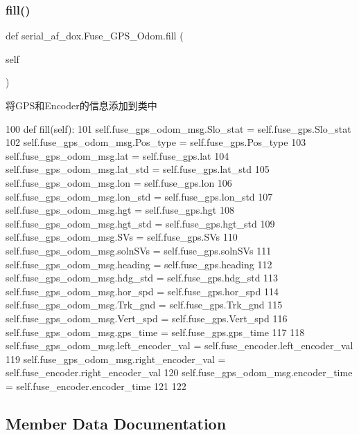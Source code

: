 \subsubsection{\texorpdfstring{fill()}{fill()}}
{\footnotesize\ttfamily def serial\+\_\+af\+\_\+dox.\+Fuse\+\_\+\+G\+P\+S\+\_\+\+Odom.\+fill (\begin{DoxyParamCaption}\item[{}]{self }\end{DoxyParamCaption})}



将\+G\+P\+S和\+Encoder的信息添加到类中 


\begin{DoxyCode}
100     \textcolor{keyword}{def }fill(self):
101         self.fuse\_gps\_odom\_msg.Slo\_stat = self.fuse\_gps.Slo\_stat
102         self.fuse\_gps\_odom\_msg.Pos\_type = self.fuse\_gps.Pos\_type
103         self.fuse\_gps\_odom\_msg.lat = self.fuse\_gps.lat
104         self.fuse\_gps\_odom\_msg.lat\_std = self.fuse\_gps.lat\_std
105         self.fuse\_gps\_odom\_msg.lon = self.fuse\_gps.lon
106         self.fuse\_gps\_odom\_msg.lon\_std = self.fuse\_gps.lon\_std
107         self.fuse\_gps\_odom\_msg.hgt = self.fuse\_gps.hgt
108         self.fuse\_gps\_odom\_msg.hgt\_std = self.fuse\_gps.hgt\_std
109         self.fuse\_gps\_odom\_msg.SVs = self.fuse\_gps.SVs
110         self.fuse\_gps\_odom\_msg.solnSVs = self.fuse\_gps.solnSVs
111         self.fuse\_gps\_odom\_msg.heading = self.fuse\_gps.heading
112         self.fuse\_gps\_odom\_msg.hdg\_std = self.fuse\_gps.hdg\_std
113         self.fuse\_gps\_odom\_msg.hor\_spd = self.fuse\_gps.hor\_spd
114         self.fuse\_gps\_odom\_msg.Trk\_gnd = self.fuse\_gps.Trk\_gnd
115         self.fuse\_gps\_odom\_msg.Vert\_spd = self.fuse\_gps.Vert\_spd
116         self.fuse\_gps\_odom\_msg.gps\_time = self.fuse\_gps.gps\_time
117 
118         self.fuse\_gps\_odom\_msg.left\_encoder\_val = self.fuse\_encoder.left\_encoder\_val
119         self.fuse\_gps\_odom\_msg.right\_encoder\_val = self.fuse\_encoder.right\_encoder\_val
120         self.fuse\_gps\_odom\_msg.encoder\_time = self.fuse\_encoder.encoder\_time
121 
122 
\end{DoxyCode}


\subsection{Member Data Documentation}
\mbox{\label{classserial__af__dox_1_1_fuse___g_p_s___odom_a940d7d559ebfed6552fb4075c0311158}} 
